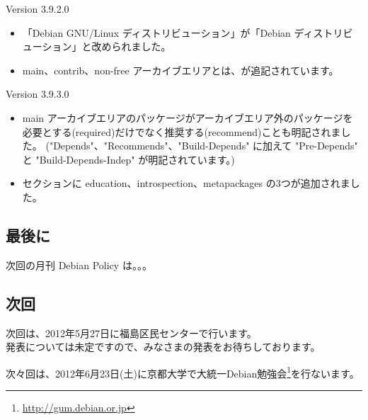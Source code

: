 \documentclass[mingoth,a4paper]{jsarticle}
\begin{document}
Version 3.9.2.0
\begin{itemize}
\item 「Debian GNU/Linux ディストリビューション」が「Debian ディストリビューション」と改められました。
\item main、contrib、non-free アーカイブエリアとは、が追記されています。
\end{itemize}

Version 3.9.3.0
\begin{itemize}
\item main アーカイブエリアのパッケージがアーカイブエリア外のパッケージを必要とする(required)だけでなく推奨する(recommend)ことも明記されました。
  ("Depends"、"Recommends"、"Build-Depends" に加えて "Pre-Depends" と "Build-Depends-Indep" が明記されています。)
\item セクションに education、introspection、metapackages の3つが追加されました。
\end{itemize}

\subsection{最後に}
次回の月刊 Debian Policy は。。。

\clearpage


\subsection{次回}

次回は、2012年5月27日に福島区民センターで行います。\\
発表については未定ですので、みなさまの発表をお待ちしております。

次々回は、2012年6月23日(土)に京都大学で大統一Debian勉強会\footnote{\url{http://gum.debian.or.jp}}を行ないます。

\mbox{}\newpage
\mbox{}\newpage

\printindex
 \cleartooddpage
\end{document}
